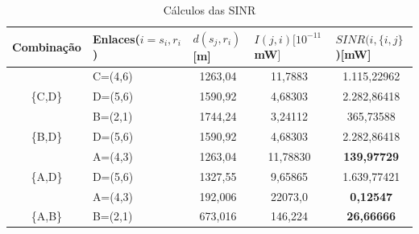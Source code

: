 {{\begin{table}[]
\centering
\caption{Cálculos das SINR}
\label{table:sinr}
\begin{tabular}{|c|l|c|c|c|}
\hline
\multicolumn{1}{|l|}{Combinação} & Enlaces($i=s_i,r_i$) & \multicolumn{1}{l|}{$d(s_j,r_i)${[}m{]}} & \multicolumn{1}{l|}{$I(j,i)[10^{-11}$mW$]$} & \multicolumn{1}{l|}{$SINR(i, \{i,j\}$){[}mW{]}} \\ \hline
                                 & C=(4,6)          & 1263,04                              & 11,7883                                  & \cellcolor[HTML]{9AFF99}1.115,22962           \\ \cline{2-5} 
\multirow{-2}{*}{\{C,D\}}        & D=(5,6)          & 1590,92                              & 4,68303                                  & \cellcolor[HTML]{9AFF99}2.282,86418           \\ \hline
                                 & B=(2,1)          & 1744,24                              & 3,24112                                  & \cellcolor[HTML]{9AFF99}365,73588             \\ \cline{2-5} 
\multirow{-2}{*}{\{B,D\}}        & D=(5,6)          & 1590,92                              & 4,68303                                  & \cellcolor[HTML]{9AFF99}2.282,86418           \\ \hline
                                 & A=(4,3)          & 1263,04                              & 11,78830                                 & \cellcolor[HTML]{FFCCC9}\textbf{139,97729}    \\ \cline{2-5} 
\multirow{-2}{*}{\{A,D\}}        & D=(5,6)          & 1327,55                              & 9,65865                                  & \cellcolor[HTML]{9AFF99}1.639,77421           \\ \hline
                                 & A=(4,3)          & 192,006                              & 22073,0                                  & \cellcolor[HTML]{FFCCC9}\textbf{0,12547}      \\ \cline{2-5} 
\multirow{-2}{*}{\{A,B\}}        & B=(2,1)          & 673,016                              & 146,224                                  & \cellcolor[HTML]{FFCCC9}\textbf{26,66666}     \\ \hline
\end{tabular}
\end{table}


}}
